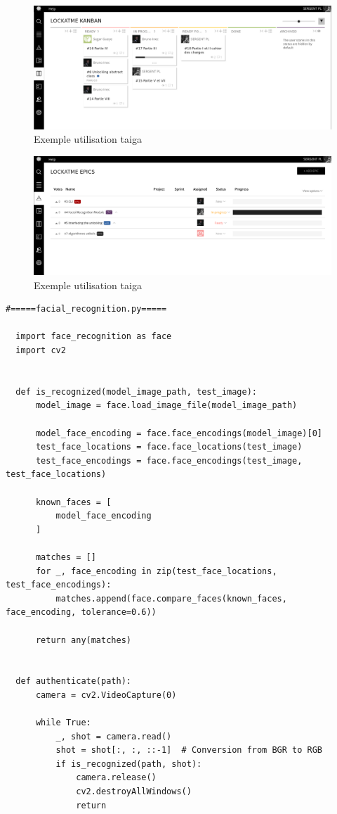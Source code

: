 \documentclass[french]{report}
\begin{document}
\begin{figure}[h]\label{fig:Taiga}
  \includegraphics[width=\linewidth]{taiga2}
  \caption{Exemple utilisation taiga}
  \label{fig:Taiga}
\end{figure}

\begin{figure}[h]\label{fig:Taiga}
  \includegraphics[width=\linewidth]{taiga}
  \caption{Exemple utilisation taiga}
  \label{fig:Taiga}
\end{figure}

\newpage

\begin{verbatim}
#=====facial_recognition.py=====

  import face_recognition as face
  import cv2


  def is_recognized(model_image_path, test_image):
      model_image = face.load_image_file(model_image_path)

      model_face_encoding = face.face_encodings(model_image)[0]
      test_face_locations = face.face_locations(test_image)
      test_face_encodings = face.face_encodings(test_image, test_face_locations)

      known_faces = [
          model_face_encoding
      ]

      matches = []
      for _, face_encoding in zip(test_face_locations, test_face_encodings):
          matches.append(face.compare_faces(known_faces, face_encoding, tolerance=0.6))

      return any(matches)


  def authenticate(path):
      camera = cv2.VideoCapture(0)

      while True:
          _, shot = camera.read()
          shot = shot[:, :, ::-1]  # Conversion from BGR to RGB
          if is_recognized(path, shot):
              camera.release()
              cv2.destroyAllWindows()
              return
\end{verbatim}
\end{document}
